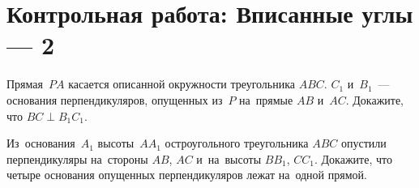 
\section*{Контрольная работа: Вписанные углы --- 2}


\begin{problems}

\item
Прямая~$PA$ касается описанной окружности треугольника $ABC$.
$C_1$ и~$B_1$~--- основания перпендикуляров, опущенных из~$P$
на~прямые $AB$ и~$AC$.
Докажите, что $BC \perp B_1 C_1$.

\item
Из~основания~$A_1$ высоты~$A A_1$ остроугольного треугольника $ABC$ опустили
перпендикуляры на~стороны $AB$, $AC$ и~на~высоты $B B_1$, $C C_1$.
Докажите, что четыре основания опущенных перпендикуляров лежат на~одной прямой.

\end{problems}

